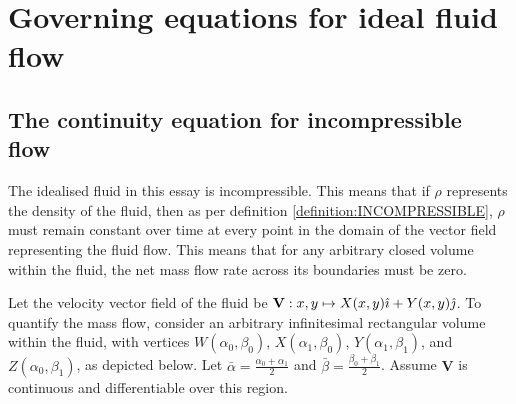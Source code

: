 \section{Governing equations for ideal fluid flow}
\subsection{The continuity equation for incompressible flow}
The idealised fluid in this essay is incompressible. This means that if $\rho$ represents the density of the fluid, then as per definition \ref{definition:INCOMPRESSIBLE}, $\rho$ must 
remain constant over time at every point in the domain of the vector field representing the fluid flow. This means that for any arbitrary closed volume within the fluid, the net mass
flow rate across its boundaries must be zero.

Let the velocity vector field of the fluid be $\mathbf{V}:x,y\mapsto X(x,y)\hat{\imath}+Y(x,y)\hat{\jmath}$. To quantify the mass flow, consider an arbitrary infinitesimal rectangular volume within
the fluid, with vertices $W(\alpha_0,\beta_0)$, $X(\alpha_1,\beta_0)$, $Y(\alpha_1,\beta_1)$, and $Z(\alpha_0,\beta_1)$, as depicted below. Let $\bar{\alpha}=\frac{\alpha_0+\alpha_1}{2}$
and $\bar{\beta}=\frac{\beta_0+\beta_1}{2}$. Assume $\mathbf{V}$ is continuous and differentiable over this region.

\begin{center}
\end{center}

